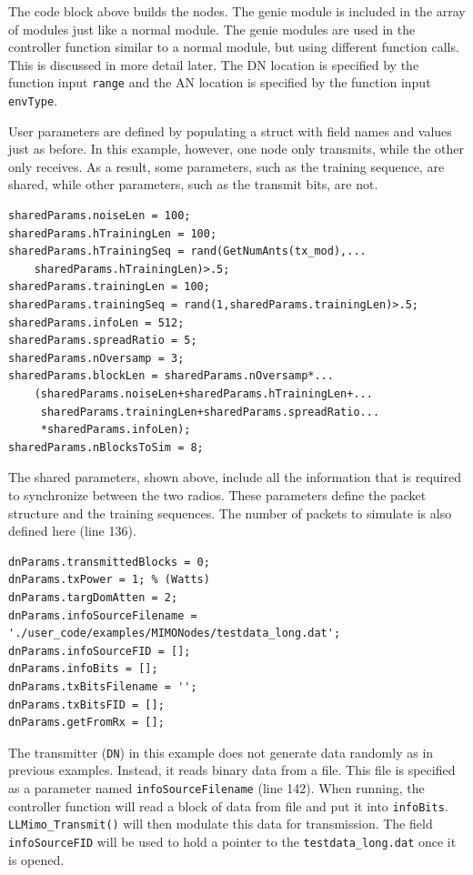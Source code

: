 The code block above builds the nodes.  The genie module is included
in the array of modules just like a normal module.  The genie
modules are used in the controller function similar to a normal
module, but using different function calls.  This is discussed in
more detail later.  The DN location is specified by the function input \verb+range+ and the AN location is specified by the function input \verb+envType+.

User parameters are defined by populating a struct with field names
and values just as before.  In this example, however, one node only
transmits, while the other only receives.  As a result, some
parameters, such as the training sequence, are shared, while other
parameters, such as the transmit bits, are not.

\begin{lstlisting}[name=llmimoBuild]
% Define shared parameters (packet definition)
sharedParams.noiseLen = 100;
sharedParams.hTrainingLen = 100;
sharedParams.hTrainingSeq = rand(GetNumAnts(tx_mod),...
    sharedParams.hTrainingLen)>.5;
sharedParams.trainingLen = 100;
sharedParams.trainingSeq = rand(1,sharedParams.trainingLen)>.5;
sharedParams.infoLen = 512;
sharedParams.spreadRatio = 5;
sharedParams.nOversamp = 3;
sharedParams.blockLen = sharedParams.nOversamp*...
    (sharedParams.noiseLen+sharedParams.hTrainingLen+...
     sharedParams.trainingLen+sharedParams.spreadRatio...
     *sharedParams.infoLen);
sharedParams.nBlocksToSim = 8;

\end{lstlisting}

The shared parameters, shown above, include all the information that
is required to synchronize between the two radios.  These parameters
define the packet structure and the training sequences.  The number
of packets to simulate is also defined here (line 136).

\begin{lstlisting}[name=llmimoBuild]
% DN-specific (Transmitter) parameters
dnParams.transmittedBlocks = 0;
dnParams.txPower = 1; % (Watts)
dnParams.targDomAtten = 2;
dnParams.infoSourceFilename = './user_code/examples/MIMONodes/testdata_long.dat';
dnParams.infoSourceFID = [];
dnParams.infoBits = [];
dnParams.txBitsFilename = '';
dnParams.txBitsFID = [];
dnParams.getFromRx = [];

\end{lstlisting}

The transmitter (\verb+DN+) in this example does not generate data
randomly as in previous examples.  Instead, it reads binary data
from a file.  This file is specified as a parameter named
\verb+infoSourceFilename+ (line 142).  When running, the controller
function will read a block of data from file and put it into
\verb+infoBits+. \verb+LLMimo_Transmit()+ will then modulate this
data for transmission. The field \verb+infoSourceFID+ will be used
to hold a pointer to the \verb+testdata_long.dat+ once it is opened.

